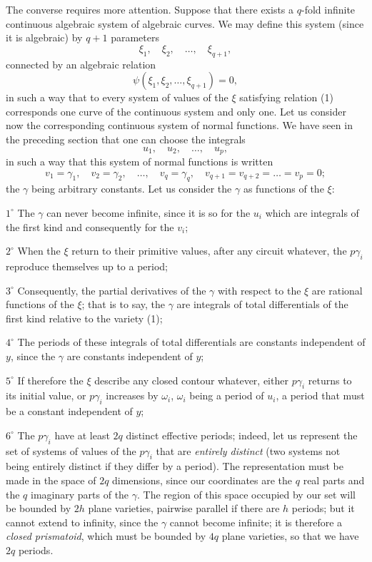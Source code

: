 \documentclass{article}
\begin{document}
The converse requires more attention. Suppose that there exists a $q$-fold infinite continuous algebraic system of algebraic curves. We may define this system (since it is algebraic) by $q + 1$ parameters
\[
\xi_{1}, \quad \xi_{2}, \quad \ldots, \quad \xi_{q+1},
\]
connected by an algebraic relation
\[
\psi(\xi_{1}, \xi_{2}, \ldots, \xi_{q+1}) = 0, \tag{1}
\]
in such a way that to every system of values of the $\xi$ satisfying relation (1) corresponds one curve of the continuous system and only one. Let us consider now the corresponding continuous system of normal functions. We have seen in the preceding section that one can choose the integrals
\[
u_{1}, \quad u_{2}, \quad \ldots, \quad u_{p},
\]
in such a way that this system of normal functions is written
\[
v_{1} = \gamma_{1}, \quad v_{2} = \gamma_{2}, \quad \ldots, \quad v_{q} = \gamma_{q}, \quad v_{q+1} = v_{q+2} = \ldots = v_{p} = 0;
\]
the $\gamma$ being arbitrary constants. Let us consider the $\gamma$ as functions of the $\xi$:

$1^\circ$ The $\gamma$ can never become infinite, since it is so for the $u_{i}$ which are integrals of the first kind and consequently for the $v_{i}$;

$2^\circ$ When the $\xi$ return to their primitive values, after any circuit whatever, the $p\gamma_{i}$ reproduce themselves up to a period;

$3^\circ$ Consequently, the partial derivatives of the $\gamma$ with respect to the $\xi$ are rational functions of the $\xi$; that is to say, the $\gamma$ are integrals of total differentials of the first kind relative to the variety (1);

$4^\circ$ The periods of these integrals of total differentials are constants independent of $y$, since the $\gamma$ are constants independent of $y$;

$5^\circ$ If therefore the $\xi$ describe any closed contour whatever, either $p\gamma_{i}$ returns to its initial value, or $p\gamma_{i}$ increases by $\omega_{i}$, $\omega_{i}$ being a period of $u_{i}$, a period that must be a constant independent of $y$;

$6^\circ$ The $p\gamma_{i}$ have at least $2q$ distinct effective periods; indeed, let us represent the set of systems of values of the $p\gamma_{i}$ that are \emph{entirely distinct} (two systems not being entirely distinct if they differ by a period). The representation must be made in the space of $2q$ dimensions, since our coordinates are the $q$ real parts and the $q$ imaginary parts of the $\gamma$. The region of this space occupied by our set will be bounded by $2h$ plane varieties, pairwise parallel if there are $h$ periods; but it cannot extend to infinity, since the $\gamma$ cannot become infinite; it is therefore a \emph{closed prismatoid}, which must be bounded by $4q$ plane varieties, so that we have $2q$ periods.
\end{document}
